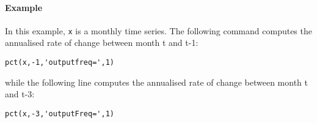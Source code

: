 \paragraph{Example}

In this example, \texttt{x} is a monthly time series. The following
command computes the annualised rate of change between month t and t-1:

\begin{verbatim}
pct(x,-1,'outputfreq=',1)
\end{verbatim}

while the following line computes the annualised rate of change between
month t and t-3:

\begin{verbatim}
pct(x,-3,'outputFreq=',1)
\end{verbatim}


